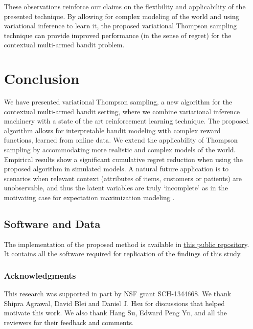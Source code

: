 \documentclass{article}
\begin{document}
These observations reinforce our claims on the flexibility and applicability of the presented technique. By allowing for complex modeling of the world and using variational inference to learn it, the proposed variational Thompson sampling technique can provide improved performance (in the sense of regret) for the contextual multi-armed bandit problem.

\section{Conclusion}
\label{sec:conclusion}

We have presented variational Thompson sampling, a new algorithm for the contextual multi-armed bandit setting, where we combine variational inference machinery with a state of the art reinforcement learning technique. The proposed algorithm allows for interpretable bandit modeling with complex reward functions, learned from online data. We extend the applicability of Thompson sampling by accommodating more realistic and complex models of the world. Empirical results show a significant cumulative regret reduction when using the proposed algorithm in simulated models. A natural future application is to scenarios when relevant context (attributes of items, customers or patients) are unobservable, and thus the latent variables are truly `incomplete' as in the motivating case for expectation maximization modeling \cite{j-Dempster1977}.

\subsection{Software and Data}
The implementation of the proposed method is available in \href{https://github.com/iurteaga/bandits}{this public repository}. It contains all the software required for replication of the findings of this study.

\subsubsection*{Acknowledgments}
This research was supported in part by NSF grant SCH-1344668. We thank Shipra Agrawal, David Blei and Daniel J. Hsu for discussions that helped motivate this work. We also thank Hang Su, Edward Peng Yu, and all the reviewers for their feedback and comments.


%

\end{document}
